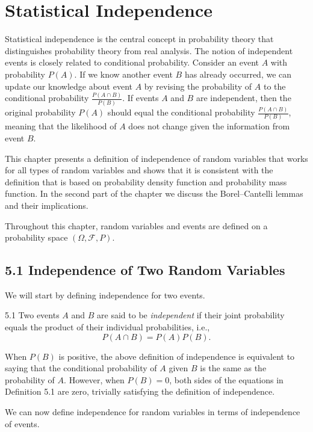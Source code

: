 \section*{Statistical Independence}

Statistical independence is the central concept in probability theory that distinguishes probability theory from real analysis. The notion of independent events is closely related to conditional probability. Consider an event $A$ with probability $P(A)$. If we know another event $B$ has already occurred, we can update our knowledge about event $A$ by revising the probability of $A$ to the conditional probability $\frac{P(A \cap B)}{P(B)}$. If events $A$ and $B$ are independent, then the original probability $P(A)$ should equal the conditional probability $\frac{P(A \cap B)}{P(B)}$, meaning that the likelihood of $A$ does not change given the information from event $B$.

This chapter presents a definition of independence of random variables that works for all types of random variables and shows that it is consistent with the definition that is based on probability density function and probability mass function. In the second part of the chapter we discuss the Borel--Cantelli lemmas and their implications.

Throughout this chapter, random variables and events are defined on a probability space $(\Omega, \mathcal{F}, P)$.

\subsection*{5.1 Independence of Two Random Variables}

We will start by defining independence for two events.

\begin{defbox}{5.1}
Two events $A$ and $B$ are said to be \textit{independent} if their joint probability equals the product of their individual probabilities, i.e.,
\[
P(A \cap B) = P(A)P(B).
\]
\end{defbox}

When $P(B)$ is positive, the above definition of independence is equivalent to saying that the conditional probability of $A$ given $B$ is the same as the probability of $A$. However, when $P(B)=0$, both sides of the equations in Definition 5.1 are zero, trivially satisfying the definition of independence.

We can now define independence for random variables in terms of independence of events.

